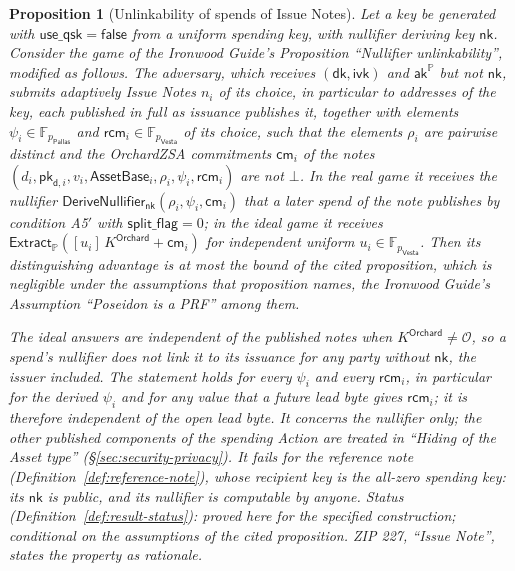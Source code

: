 \documentclass[11pt,a4paper]{article}
\newtheorem{proposition}[theorem]{Proposition}
\theoremstyle{definition}
\newcommand{\F}{\mathbb{F}}
\newcommand{\PP}{\mathbb{P}}
\newcommand{\cmsym}{\mathsf{cm}}
\newcommand{\Pallas}{\ensuremath{\mathsf{Pallas}}}
\newcommand{\Vesta}{\ensuremath{\mathsf{Vesta}}}
\newcommand{\Extract}{\ensuremath{\mathsf{Extract}}}
\newcommand{\aksym}{\ensuremath{\mathsf{ak}}}
\newcommand{\nksym}{\ensuremath{\mathsf{nk}}}
\newcommand{\ivk}{\ensuremath{\mathsf{ivk}}}
\newcommand{\dk}{\ensuremath{\mathsf{dk}}}
\newcommand{\rcm}{\ensuremath{\mathsf{rcm}}}
\begin{document}
\begin{proposition}[Unlinkability of spends of Issue Notes]
\label{prop:issue-unlink}
Let a key be generated with $\mathsf{use\_qsk} = \mathsf{false}$ from a
uniform spending key, with nullifier deriving key $\nksym$. Consider the
game of the \emph{Ironwood Guide}'s Proposition ``Nullifier
unlinkability'', modified as follows. The adversary, which receives
$(\dk, \ivk)$ and $\aksym^{\PP}$ but not $\nksym$, submits adaptively Issue
Notes $n_i$ of its choice, in particular to addresses of the key, each
published in full as issuance publishes it, together with elements
$\psi_i \in \F_{p_{\Pallas}}$ and $\rcm_i \in \F_{p_{\Vesta}}$ of its
choice, such that the elements $\rho_i$ are pairwise distinct and the
OrchardZSA commitments $\cmsym_i$ of the notes
$(d_i, \mathsf{pk}_{\mathsf{d},i}, v_i, \mathsf{AssetBase}_i, \rho_i,
\psi_i, \rcm_i)$ are not $\bot$. In the real game it receives the nullifier
$\mathsf{DeriveNullifier}_{\nksym}(\rho_i, \psi_i, \cmsym_i)$ that a later
spend of the note publishes by condition A5$'$ with
$\mathsf{split\_flag} = 0$; in the ideal game it receives
$\Extract_{\PP}([u_i]\,K^{\mathsf{Orchard}} + \cmsym_i)$ for independent
uniform $u_i \in \F_{p_{\Vesta}}$. Then its distinguishing advantage is at
most the bound of the cited proposition, which is negligible under the
assumptions that proposition names, the \emph{Ironwood Guide}'s Assumption
``Poseidon is a PRF'' among them.

The ideal answers are independent of the published notes when
$K^{\mathsf{Orchard}} \neq \mathcal{O}$, so a spend's nullifier does not
link it to its issuance for any party without $\nksym$, the issuer
included. The statement holds for every $\psi_i$ and every $\rcm_i$, in
particular for the derived $\psi_i$ and for any value that a future lead
byte gives $\rcm_i$; it is therefore independent of the open lead byte.
It concerns the nullifier only; the other published components of the spending
Action are treated in ``Hiding of the Asset
type'' (\S\ref{sec:security-privacy}). It fails for the reference note
(Definition~\ref{def:reference-note}), whose recipient key is the all-zero
spending key: its $\nksym$ is public, and its nullifier is computable by
anyone. Status (Definition~\ref{def:result-status}): proved here for the
specified construction; conditional on the assumptions of the cited
proposition. ZIP 227, ``Issue Note'', states the property as rationale.
\end{proposition}
\end{document}
